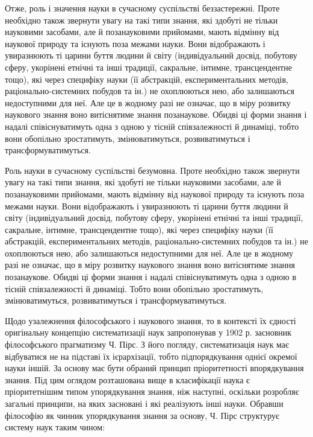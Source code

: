 Отже, роль і значення науки в сучасному суспільстві беззастережні. Проте
необхідно також звернути увагу на такі типи знання, які здобуті не тільки
науковими засобами, але й позанауковими прийомами, мають відмінну від
наукової природу та існують поза межами науки. Вони відображають і
увиразнюють ті царини буття людини й світу (індивідуальний досвід, побутову
сферу, укорінені етнічні та інші традиції, сакральне, інтимне, трансцендентне
тощо), які через специфіку науки (її абстракцій, експериментальних методів,
раціонально-системних побудов та ін.) не охоплюються нею, або залишаються
недоступними для неї. Але це в жодному разі не означає, що в міру розвитку
наукового знання воно витіснятиме знання позанаукове. Обидві ці форми
знання і надалі співіснуватимуть одна з одною у тісній співзалежності й
динаміці, тобто вони обопільно зростатимуть, змінюватимуться,
розвиватимуться і трансформуватимуться.

Роль науки в сучасному суспільстві безумовна. Проте необхідно також
звернути увагу на такі типи знання, які здобуті не тільки науковими засобами,
але й позанауковими прийомами, мають відмінну від наукової природу та
існують поза межами науки. Вони відображають і увиразнюють ті царини буття
людини й світу (індивідуальний досвід, побутову сферу, укорінені етнічні та
інші традиції, сакральне, інтимне, трансцендентне тощо), які через специфіку
науки (її абстракцій, експериментальних методів, раціонально-системних
побудов та ін.) не охоплюються нею, або залишаються недоступними для неї.
Але це в жодному разі не означає, що в міру розвитку наукового знання воно
витіснятиме знання позанаукове. Обидві ці форми знання і надалі
співіснуватимуть одна з одною в тісній співзалежності й динаміці. Тобто вони
обопільно зростатимуть, змінюватимуться, розвиватимуться і
трансформуватимуться.

Щодо узалежнення філософського і наукового знання, то в контексті їх
єдності оригінальну концепцію систематизації наук запропонував у 1902 р.
засновник філософського прагматизму Ч. Пірс. З його погляду, систематизація
наук має відбуватися не на підставі їх ієрархізації, тобто підпорядкування
однієї окремої науки іншій. За основу має бути обраний принцип
пріоритетності впорядкування знання. Під цим оглядом розташована вище в
класифікації наука є пріоритетнішим типом упорядкування знання, ніж
наступні, оскільки розробляє загальні принципи, на яких засновані і які
реалізують інші науки. Обравши філософію як чинник упорядкування знання за
основу, Ч. Пірс структурує систему наук таким чином:

